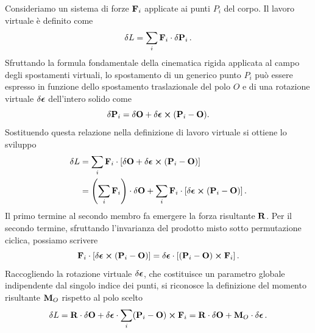 Consideriamo un sistema di forze $\vb{F}_i$ applicate ai punti $P_i$ del corpo. Il lavoro virtuale è definito come
\begin{equation*}
    \var{L} = \sum_i \vb{F}_i \cdot \var{\vb{P}_i}.
\end{equation*}
Sfruttando la formula fondamentale della cinematica rigida applicata al campo degli spostamenti virtuali, lo spostamento di un generico punto $P_i$ può essere espresso in funzione dello spostamento traslazionale del polo $O$ e di una rotazione virtuale $\var{\vb*{\epsilon}}$ dell'intero solido come
\begin{equation*}
    \var{\vb{P}_i} = \var{\vb{O}} + \var{\vb*{\epsilon}} \cross (\vb{P}_i - \vb{O}).
\end{equation*}
Sostituendo questa relazione nella definizione di lavoro virtuale si ottiene lo sviluppo
\begin{align*}
    \var{L} &= \sum_i \vb{F}_i \cdot \left[ \var{\vb{O}} + \var{\vb*{\epsilon}} \cross (\vb{P}_i - \vb{O}) \right] \\
    &= \left( \sum_i \vb{F}_i \right) \cdot \var{\vb{O}} + \sum_i \vb{F}_i \cdot \left[ \var{\vb*{\epsilon}} \cross (\vb{P}_i - \vb{O}) \right].
\end{align*}
Il primo termine al secondo membro fa emergere la forza risultante $\vb{R}$. Per il secondo termine, sfruttando l'invarianza del prodotto misto sotto permutazione ciclica, possiamo scrivere
\begin{equation*}
    \vb{F}_i \cdot \left[ \var{\vb*{\epsilon}} \cross (\vb{P}_i - \vb{O}) \right] = \var{\vb*{\epsilon}} \cdot \left[ (\vb{P}_i - \vb{O}) \cross \vb{F}_i \right].
\end{equation*}
Raccogliendo la rotazione virtuale $\var{\vb*{\epsilon}}$, che costituisce un parametro globale indipendente dal singolo indice dei punti, si riconosce la definizione del momento risultante $\vb{M}_O$ rispetto al polo scelto
\begin{equation*}
    \var{L} = \vb{R} \cdot \var{\vb{O}} + \var{\vb*{\epsilon}} \cdot \sum_i (\vb{P}_i - \vb{O}) \cross \vb{F}_i = \vb{R} \cdot \var{\vb{O}} + \vb{M}_O \cdot \var{\vb*{\epsilon}}.
\end{equation*}

